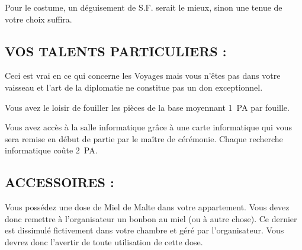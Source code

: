 \documentclass[14pt,twocolumn]{extarticle}
\begin{document}
Pour le costume, un déguisement de S.F. serait le mieux, sinon une tenue de
votre choix suffira.

\subsection{VOS TALENTS PARTICULIERS :}

Ceci est vrai en ce qui concerne les Voyages mais vous n'êtes pas dans votre
vaisseau et l'art de la diplomatie ne constitue pas un don exceptionnel.

Vous avez le loisir de fouiller les pièces de la base moyennant 1~PA par
fouille.

Vous avez accès à la salle informatique grâce à une carte informatique qui vous
sera remise en début de partie par le maître de cérémonie. Chaque recherche
informatique coûte 2~PA.

\subsection{ACCESSOIRES :}

Vous possédez une dose de Miel de Malte dans votre appartement. Vous devez donc
remettre à l'organisateur un bonbon au miel (ou à autre chose). Ce dernier est
dissimulé fictivement dans votre chambre et géré par l'organisateur. Vous
devrez donc l'avertir de toute utilisation de cette dose.
\end{document}
